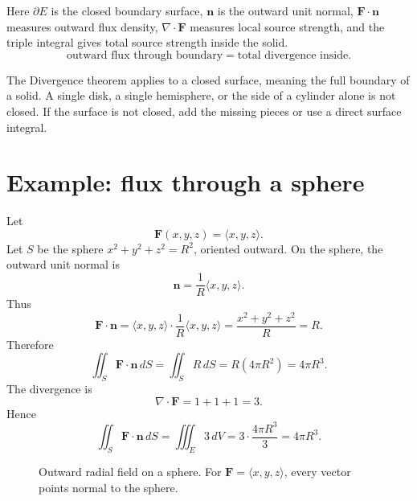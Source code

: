 \documentclass[11pt]{article}
\newcommand{\vn}{\mathbf n}
\newcommand{\vF}{\mathbf F}
\begin{document}
Here $\partial E$ is the closed boundary surface, $\vn$ is the outward unit normal, $\vF\cdot\vn$ measures outward flux density, $\nabla\cdot\vF$ measures local source strength, and the triple integral gives total source strength inside the solid.
\[
\text{outward flux through boundary}=\text{total divergence inside}.
\]

\begin{importantbox}
The Divergence theorem applies to a closed surface, meaning the full boundary of a solid. A single disk, a single hemisphere, or the side of a cylinder alone is not closed. If the surface is not closed, add the missing pieces or use a direct surface integral.
\end{importantbox}

\section{Example: flux through a sphere}

\begin{examplebox}
Let
\[
\vF(x,y,z)=\langle x,y,z\rangle.
\]
Let $S$ be the sphere $x^2+y^2+z^2=R^2$, oriented outward. On the sphere, the outward unit normal is
\[
\vn=\frac{1}{R}\langle x,y,z\rangle.
\]
Thus
\[
\vF\cdot\vn=\langle x,y,z\rangle\cdot\frac{1}{R}\langle x,y,z\rangle=\frac{x^2+y^2+z^2}{R}=R.
\]
Therefore
\[
\iint_S\vF\cdot\vn\,dS=\iint_SR\,dS=R(4\pi R^2)=4\pi R^3.
\]
The divergence is
\[
\nabla\cdot\vF=1+1+1=3.
\]
Hence
\[
\iint_S\vF\cdot\vn\,dS=\iiint_E3\,dV=3\cdot\frac{4\pi R^3}{3}=4\pi R^3.
\]
\end{examplebox}

\begin{figure}[H]
\centering
{}
\caption{Outward radial field on a sphere. For $\vF=\langle x,y,z\rangle$, every vector points normal to the sphere.}
\end{figure}
\end{document}
